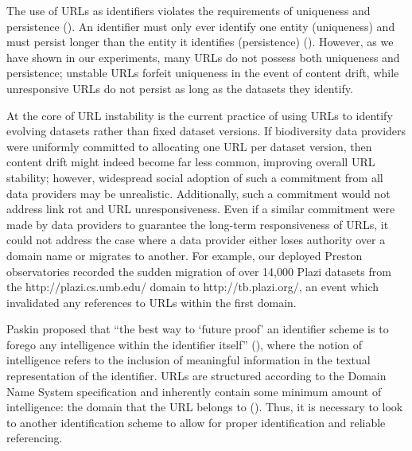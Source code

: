 \documentclass[12pt,letterpaper]{article}
\begin{document}
The use of URLs as identifiers violates the requirements of uniqueness and persistence (\cite{Paskin_1999}). An identifier must only ever identify one entity (uniqueness) and must persist longer than the entity it identifies (persistence) (\cite{Paskin_1999}). However, as we have shown in our experiments, many URLs do not possess both uniqueness and persistence; unstable URLs forfeit uniqueness in the event of content drift, while unresponsive URLs do not persist as long as the datasets they identify.

At the core of URL instability is the current practice of using URLs to identify evolving datasets rather than fixed dataset versions. If biodiversity data providers were uniformly committed to allocating one URL per dataset version, then content drift might indeed become far less common, improving overall URL stability; however, widespread social adoption of such a commitment from all data providers may be unrealistic. Additionally, such a commitment would not address link rot and URL unresponsiveness. Even if a similar commitment were made by data providers to guarantee the long-term responsiveness of URLs, it could not address the case where a data provider either loses authority over a domain name or migrates to another. For example, our deployed Preston observatories recorded the sudden migration of over 14,000 Plazi datasets from the http://plazi.cs.umb.edu/ domain to http://tb.plazi.org/, an event which invalidated any references to URLs within the first domain.

Paskin proposed that “the best way to ‘future proof’ an identifier scheme is to forego any intelligence within the identifier itself” (\cite{Paskin_1999}), where the notion of intelligence refers to the inclusion of meaningful information in the textual representation of the identifier. URLs are structured according to the Domain Name System specification and inherently contain some minimum amount of intelligence: the domain that the URL belongs to (\cite{rfc1034}). Thus, it is necessary to look to another identification scheme to allow for proper identification and reliable referencing.
\end{document}

